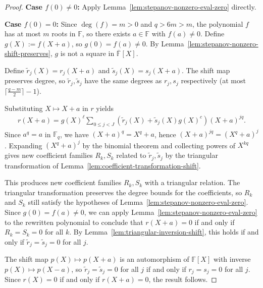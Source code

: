 \begin{proof} \leanok
  \textbf{Case $f(0) \neq 0$:} Apply Lemma~\ref{lem:stepanov-nonzero-eval-zero} directly.

  \textbf{Case $f(0) = 0$:} Since $\deg(f) = m > 0$ and $q > 6m > m$, the polynomial $f$ has at most $m$ roots in $\mathbb{F}$, so there exists $a \in \mathbb{F}$ with $f(a) \neq 0$. Define $g(X) := f(X + a)$, so $g(0) = f(a) \neq 0$. By Lemma~\ref{lem:stepanov-nonzero-shift-preserves}, $g$ is not a square in $\overline{\mathbb{F}}[X]$.

  Define $\tilde{r}_j(X) = r_j(X+a)$ and $\tilde{s}_j(X) = s_j(X+a)$. The shift map preserves degree, so $\tilde{r}_j, \tilde{s}_j$ have the same degrees as $r_j, s_j$ respectively (at most $\lceil\frac{q-m}{2}\rceil - 1$).

  Substituting $X \mapsto X + a$ in $r$ yields
  \begin{align*}
    r(X + a) = g(X)^\ell \sum_{0 \leq j < J} (\tilde{r}_j(X) + \tilde{s}_j(X) g(X)^c) (X + a)^{jq}.
  \end{align*}
  Since $a^q = a$ in $\mathbb{F}_q$, we have $(X + a)^q = X^q + a$, hence $(X + a)^{jq} = (X^q + a)^j$. Expanding $(X^q + a)^j$ by the binomial theorem and collecting powers of $X^{kq}$ gives new coefficient families $R_k, S_k$ related to $\tilde{r}_j, \tilde{s}_j$ by the triangular transformation of Lemma~\ref{lem:coefficient-transformation-shift}.

  This produces new coefficient families $R_k, S_k$ with a triangular relation. The triangular transformation preserves the degree bounds for the coefficients, so $R_k$ and $S_k$ still satisfy the hypotheses of Lemma~\ref{lem:stepanov-nonzero-eval-zero}. Since $g(0) = f(a) \neq 0$, we can apply Lemma~\ref{lem:stepanov-nonzero-eval-zero} to the rewritten polynomial to conclude that $r(X + a) = 0$ if and only if $R_k = S_k = 0$ for all $k$. By Lemma~\ref{lem:triangular-inversion-shift}, this holds if and only if $\tilde{r}_j = \tilde{s}_j = 0$ for all $j$.

  The shift map $p(X) \mapsto p(X+a)$ is an automorphism of $\mathbb{F}[X]$ with inverse $p(X) \mapsto p(X-a)$, so $\tilde{r}_j = \tilde{s}_j = 0$ for all $j$ if and only if $r_j = s_j = 0$ for all $j$. Since $r(X) = 0$ if and only if $r(X+a) = 0$, the result follows.
\end{proof}


